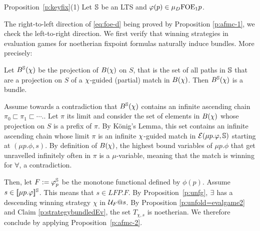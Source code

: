 
\begin{proofof}{Proposition~\ref{p:keyfix}(1)}
%    
Let $\mathbb{S}$ be an LTS and $\varphi(p) \in \mu_{D}\mathrm{FOE}_1{p}$. 

The right-to-left direction of \eqref{eq:foe-d} being proved by Proposition \ref{p:afmc-1}, we check the left-to-right direction. We first verify that winning strategies in evaluation games for noetherian fixpoint formulas naturally induce bundles. More precisely:


\begin{claim}\label{p:strategybundledEv}
Let $B^{\mathbb{S}}(\chi)$ be the projection of $B(\chi)$ on $S$, that is the set of all paths in $\mathbb{S}$ that are a projection on $S$ of a $\chi$-guided (partial) match in $B(\chi)$. Then $B^{\mathbb{S}}(\chi)$ is a bundle.
\end{claim}
\begin{pfclaim}
Assume towards a contradiction that $B^{\mathbb{S}}(\chi)$ contains an  infinite ascending chain $\pi_{0} \sqsubset \pi_{1} \sqsubset 
\cdots.$. Let $\pi$ its limit and consider the set of elements in $B(\chi)$ whose projection on $S$ is a prefix of $\pi$. 
By  K\"{o}nig's Lemma, this set contains an infinite ascending chain whose limit $\pi$ is an infinite $\chi$-guided match  in $\mathcal{E}(\mu p. \varphi,\mathbb{S})$ starting at $(\mu p. \phi,s)$. By definition of $B(\chi)$,  the highest bound variables of $\mu p. \phi$ that get unravelled infinitely often
in $\pi$ is a $\mu$-variable, meaning that the match is winning for $\forall$, a contradiction.
\end{pfclaim}
%
\noindent

Then, let $F := \varphi_{p}^{\mathbb{S}}$ be the monotone functional defined by $\phi(p)$. Assume $s \in [\![ \mu p.\varphi ]\!]^{\mathbb{S}}$. This means that $s \in  LFP. F$. By Proposition~\ref{p:unfg},  $\exists$ has a descending winning strategy $\chi$ in 
$\mathcal{U}_{F}@s$. By Proposition \ref{p:unfold=evalgame2} and Claim \ref{p:strategybundledEv}, the set $T_{\chi, s}$ is noetherian.   We therefore conclude by applying  Proposition~\ref{p:afmc-2}.
\end{proofof}
